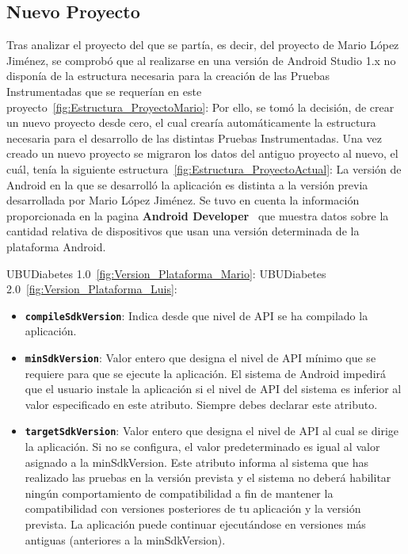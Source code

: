 \subsection{Nuevo Proyecto}
Tras analizar el proyecto del que se partía, es decir, del proyecto de Mario López Jiménez, se comprobó que al realizarse en una versión de Android Studio 1.x no disponía de la estructura necesaria para la creación de las Pruebas Instrumentadas que se requerían en este proyecto~\ref{fig:Estructura_ProyectoMario}:
Por ello, se tomó la decisión, de crear un nuevo proyecto desde cero, el cual crearía automáticamente la estructura necesaria para el desarrollo de las distintas Pruebas Instrumentadas. Una vez creado un nuevo proyecto se migraron los datos del antiguo proyecto al nuevo, el cuál, tenía la siguiente estructura~\ref{fig:Estructura_ProyectoActual}:
La versión de Android en la que se desarrolló la aplicación es distinta a la versión previa desarrollada por Mario López Jiménez. Se tuvo en cuenta la información proporcionada en la pagina \textbf{Android Developer}~\cite{androiddeveloper} que muestra datos sobre la cantidad relativa de dispositivos que usan una versión determinada de la plataforma Android.

UBUDiabetes 1.0~\ref{fig:Version_Plataforma_Mario}:
UBUDiabetes 2.0~\ref{fig:Version_Plataforma_Luis}:
\begin{itemize}
	\item \textbf{\texttt{compileSdkVersion}}: Indica desde que nivel de API se ha compilado la aplicación.
	\item \textbf{\texttt{minSdkVersion}}: Valor entero que designa el nivel de API mínimo que se requiere para que se ejecute la aplicación. El sistema de Android impedirá que el usuario instale la aplicación si el nivel de API del sistema es inferior al valor especificado en este atributo. Siempre debes declarar este atributo.
	\item \textbf{\texttt{targetSdkVersion}}: Valor entero que designa el nivel de API al cual se dirige la aplicación. Si no se configura, el valor predeterminado es igual al valor asignado a la minSdkVersion.
Este atributo informa al sistema que has realizado las pruebas en la versión prevista y el sistema no deberá habilitar ningún comportamiento de compatibilidad a fin de mantener la compatibilidad con versiones posteriores de tu aplicación y la versión prevista. La aplicación puede continuar ejecutándose en versiones más antiguas (anteriores a la minSdkVersion).
\end{itemize}
